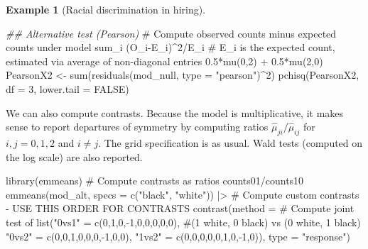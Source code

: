\documentclass[
  11pt,
  letterpaper,
]{scrbook}
\newenvironment{Shaded}{\begin{snugshade}}{\end{snugshade}}
\newcommand{\AttributeTok}[1]{\textcolor[rgb]{0.40,0.45,0.13}{#1}}
\newcommand{\CommentTok}[1]{\textcolor[rgb]{0.37,0.37,0.37}{#1}}
\newcommand{\ConstantTok}[1]{\textcolor[rgb]{0.56,0.35,0.01}{#1}}
\newcommand{\DecValTok}[1]{\textcolor[rgb]{0.68,0.00,0.00}{#1}}
\newcommand{\DocumentationTok}[1]{\textcolor[rgb]{0.37,0.37,0.37}{\textit{#1}}}
\newcommand{\FunctionTok}[1]{\textcolor[rgb]{0.28,0.35,0.67}{#1}}
\newcommand{\NormalTok}[1]{\textcolor[rgb]{0.00,0.23,0.31}{#1}}
\newcommand{\OtherTok}[1]{\textcolor[rgb]{0.00,0.23,0.31}{#1}}
\newcommand{\SpecialCharTok}[1]{\textcolor[rgb]{0.37,0.37,0.37}{#1}}
\newcommand{\StringTok}[1]{\textcolor[rgb]{0.13,0.47,0.30}{#1}}
\theoremstyle{definition}
\newtheorem{example}{Example}[chapter]
\theoremstyle{definition}
\theoremstyle{remark}
\begin{document}
\begin{example}[Racial discrimination in
hiring]
\begin{Shaded}
\begin{Highlighting}[]
\DocumentationTok{\#\# Alternative test (Pearson)}
\CommentTok{\# Compute observed counts minus expected counts under model sum\_i (O\_i{-}E\_i)\^{}2/E\_i}
\CommentTok{\# E\_i is the expected count, estimated via average of non{-}diagonal entries 0.5*mu(0,2) + 0.5*mu(2,0)}
\NormalTok{PearsonX2 }\OtherTok{\textless{}{-}} \FunctionTok{sum}\NormalTok{(}\FunctionTok{residuals}\NormalTok{(mod\_null, }\AttributeTok{type =} \StringTok{"pearson"}\NormalTok{)}\SpecialCharTok{\^{}}\DecValTok{2}\NormalTok{)}
\FunctionTok{pchisq}\NormalTok{(PearsonX2, }\AttributeTok{df =} \DecValTok{3}\NormalTok{, }\AttributeTok{lower.tail =} \ConstantTok{FALSE}\NormalTok{)}
\end{Highlighting}
\end{Shaded}

We can also compute contrasts. Because the model is multiplicative, it
makes sense to report departures of symmetry by computing ratios
\(\widehat{\mu}_{ji}/\widehat{\mu}_{ij}\) for \(i, j = 0, 1, 2\) and
\(i \neq j\). The grid specification is as usual. Wald tests (computed
on the log scale) are also reported.

\begin{Shaded}
\begin{Highlighting}[]
\FunctionTok{library}\NormalTok{(emmeans)}
\CommentTok{\# Compute contrasts as ratios counts01/counts10}
\FunctionTok{emmeans}\NormalTok{(mod\_alt, }\AttributeTok{specs =} \FunctionTok{c}\NormalTok{(}\StringTok{"black"}\NormalTok{, }\StringTok{"white"}\NormalTok{)) }\SpecialCharTok{|\textgreater{}}
  \CommentTok{\# Compute custom contrasts {-} USE THIS ORDER FOR CONTRASTS}
  \FunctionTok{contrast}\NormalTok{(}\AttributeTok{method =} \CommentTok{\# Compute joint test of}
              \FunctionTok{list}\NormalTok{(}\StringTok{"0vs1"} \OtherTok{=} \FunctionTok{c}\NormalTok{(}\DecValTok{0}\NormalTok{,}\DecValTok{1}\NormalTok{,}\DecValTok{0}\NormalTok{,}\SpecialCharTok{{-}}\DecValTok{1}\NormalTok{,}\DecValTok{0}\NormalTok{,}\DecValTok{0}\NormalTok{,}\DecValTok{0}\NormalTok{,}\DecValTok{0}\NormalTok{,}\DecValTok{0}\NormalTok{), }
                   \CommentTok{\#(1 white, 0 black) vs (0 white, 1 black)}
                   \StringTok{"0vs2"} \OtherTok{=} \FunctionTok{c}\NormalTok{(}\DecValTok{0}\NormalTok{,}\DecValTok{0}\NormalTok{,}\DecValTok{1}\NormalTok{,}\DecValTok{0}\NormalTok{,}\DecValTok{0}\NormalTok{,}\DecValTok{0}\NormalTok{,}\SpecialCharTok{{-}}\DecValTok{1}\NormalTok{,}\DecValTok{0}\NormalTok{,}\DecValTok{0}\NormalTok{),}
                   \StringTok{"1vs2"} \OtherTok{=} \FunctionTok{c}\NormalTok{(}\DecValTok{0}\NormalTok{,}\DecValTok{0}\NormalTok{,}\DecValTok{0}\NormalTok{,}\DecValTok{0}\NormalTok{,}\DecValTok{0}\NormalTok{,}\DecValTok{1}\NormalTok{,}\DecValTok{0}\NormalTok{,}\SpecialCharTok{{-}}\DecValTok{1}\NormalTok{,}\DecValTok{0}\NormalTok{)),}
           \AttributeTok{type =} \StringTok{"response"}\NormalTok{)}
\end{Highlighting}
\end{Shaded}


\end{example}
\end{document}

